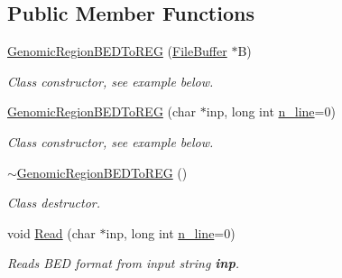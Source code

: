 \subsection*{Public Member Functions}
\begin{CompactItemize}
\item 
\hypertarget{classGenomicRegionBEDToREG_964b37e08c0c513d974e14cadaba5d20}{
\hyperlink{classGenomicRegionBEDToREG_964b37e08c0c513d974e14cadaba5d20}{GenomicRegionBEDToREG} (\hyperlink{classFileBuffer}{FileBuffer} $\ast$B)}
\label{classGenomicRegionBEDToREG_964b37e08c0c513d974e14cadaba5d20}

\begin{CompactList}\small\item\em Class constructor, see example below. \item\end{CompactList}\item 
\hypertarget{classGenomicRegionBEDToREG_b0fa681e5f8ddc81b0e27786bd86b9d9}{
\hyperlink{classGenomicRegionBEDToREG_b0fa681e5f8ddc81b0e27786bd86b9d9}{GenomicRegionBEDToREG} (char $\ast$inp, long int \hyperlink{classGenomicRegion_efe2255aeed5338060190ded05cb9c0c}{n\_\-line}=0)}
\label{classGenomicRegionBEDToREG_b0fa681e5f8ddc81b0e27786bd86b9d9}

\begin{CompactList}\small\item\em Class constructor, see example below. \item\end{CompactList}\item 
\hypertarget{classGenomicRegionBEDToREG_59650c4d898e5835271627bf8c45c609}{
\hyperlink{classGenomicRegionBEDToREG_59650c4d898e5835271627bf8c45c609}{$\sim$GenomicRegionBEDToREG} ()}
\label{classGenomicRegionBEDToREG_59650c4d898e5835271627bf8c45c609}

\begin{CompactList}\small\item\em Class destructor. \item\end{CompactList}\item 
\hypertarget{classGenomicRegionBEDToREG_3f18f7f3946f2258b30e9796fafee093}{
void \hyperlink{classGenomicRegionBEDToREG_3f18f7f3946f2258b30e9796fafee093}{Read} (char $\ast$inp, long int \hyperlink{classGenomicRegion_efe2255aeed5338060190ded05cb9c0c}{n\_\-line}=0)}
\label{classGenomicRegionBEDToREG_3f18f7f3946f2258b30e9796fafee093}

\begin{CompactList}\small\item\em Reads BED format from input string {\bf inp}. \item\end{CompactList}\end{CompactItemize}


